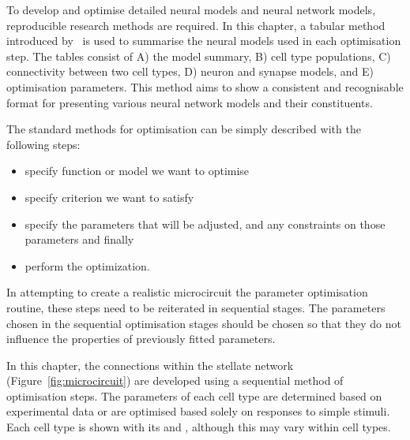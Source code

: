 

To develop and optimise detailed neural models and neural network models,
reproducible research methods are required. In this chapter, a tabular method
introduced by \citet{NordlieGewaltigEtAl:2009}~is used to summarise the neural
models used in each optimisation step. The tables consist of A) the model
summary, B) cell type populations, C) connectivity between two cell types, D)
neuron and synapse models, and E) optimisation parameters.  This method aims to
show a consistent and recognisable format for presenting various neural network
models and their constituents. 


The standard methods for optimisation can be simply described with the following
steps:\begin{itemize}
\item specify function or model we want to optimise
\item specify criterion we want to satisfy
\item specify the parameters that will be adjusted, 
  and any constraints on those parameters and finally
\item perform the optimization.
\end{itemize}
In attempting to create a realistic microcircuit the parameter optimisation
routine, these steps need to be reiterated in sequential stages. The parameters
chosen in the sequential optimisation stages should be chosen so that they do
not influence the properties of previously fitted parameters.


In this chapter, the connections within the stellate network
(Figure~\ref{fig:microcircuit}) are developed using a sequential method of
optimisation steps.  The parameters of each cell type are determined based on
experimental data or are optimised based solely on responses to simple stimuli.
Each cell type is shown with its \EIRA and \PSTH, although this may
vary within cell types.



